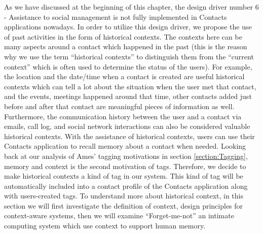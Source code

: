 As we have discussed at the beginning of this chapter, the design driver number 6 - Assistance to social management is not fully implemented in Contacts applications nowadays. In order to utilize this design driver, we propose the use of past activities in the form of historical contexts. The contexts here can be many aspects around a contact which happened in the past (this is the reason why we use the term ``historical contexts'' to distinguish them from the ``current context'' which is often used to determine the status of the users). For example, the location and the date/time when a contact is created are useful historical contexts which can tell a lot about the situation when the user met that contact, and the events, meetings happened around that time, other contacts added just before and after that contact are meaningful pieces of information as well. Furthermore, the communication history between the user and a contact via emails, call log, and social network interactions can also be considered valuable historical contexts. With the assistance of historical contexts, users can use their Contacts application to recall memory about a contact when needed. Looking back at our analysis of Ames' tagging motivations in section \ref{section:Tagging}, memory and context is the second motivation of tags. Therefore, we decide to make historical contexts a kind of tag in our system. This kind of tag will be automatically included into a contact profile of the Contacts application along with users-created tags. To understand more about historical context, in this section we will first investigate the definition of context, design principles for context-aware systems, then we will examine ``Forget-me-not'' an intimate computing system which use context to support human memory.

